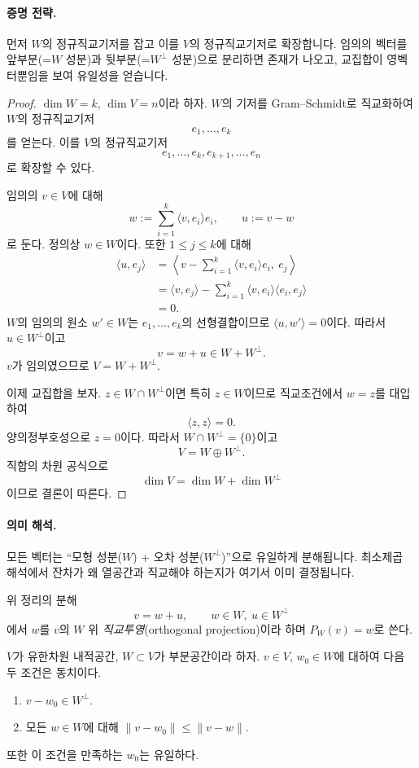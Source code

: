 \paragraph{증명 전략.}
먼저 $W$의 정규직교기저를 잡고 이를 $V$의 정규직교기저로 확장합니다. 임의의 벡터를 앞부분(=$W$ 성분)과 뒷부분(=$W^\perp$ 성분)으로 분리하면 존재가 나오고, 교집합이 영벡터뿐임을 보여 유일성을 얻습니다.

\begin{proof}
$\dim W=k$, $\dim V=n$이라 하자. $W$의 기저를 Gram--Schmidt로 직교화하여 $W$의 정규직교기저
$$
e_1,\dots,e_k
$$
를 얻는다. 이를 $V$의 정규직교기저
$$
e_1,\dots,e_k,e_{k+1},\dots,e_n
$$
로 확장할 수 있다.

임의의 $v\in V$에 대해
$$
w:=\sum_{i=1}^k\langle v,e_i\rangle e_i,\qquad
u:=v-w
$$
로 둔다. 정의상 $w\in W$이다. 또한 $1\le j\le k$에 대해
\begin{align*}
\langle u,e_j\rangle
&=\left\langle v-\sum_{i=1}^k\langle v,e_i\rangle e_i,\ e_j\right\rangle\\
&=\langle v,e_j\rangle-\sum_{i=1}^k\langle v,e_i\rangle\langle e_i,e_j\rangle\\
&=0.
\end{align*}
$W$의 임의의 원소 $w'\in W$는 $e_1,\dots,e_k$의 선형결합이므로 $\langle u,w'\rangle=0$이다. 따라서 $u\in W^\perp$이고
$$
v=w+u\in W+W^\perp.
$$
$v$가 임의였으므로 $V=W+W^\perp$.

이제 교집합을 보자. $z\in W\cap W^\perp$이면 특히 $z\in W$이므로 직교조건에서 $w=z$를 대입하여
$$
\langle z,z\rangle=0.
$$
양의정부호성으로 $z=0$이다. 따라서 $W\cap W^\perp=\{0\}$이고
$$
V=W\oplus W^\perp.
$$
직합의 차원 공식으로
$$
\dim V=\dim W+\dim W^\perp
$$
이므로 결론이 따른다.
\end{proof}

\paragraph{의미 해석.}
모든 벡터는 ``모형 성분($W$) + 오차 성분($W^\perp$)''으로 유일하게 분해됩니다. 최소제곱 해석에서 잔차가 왜 열공간과 직교해야 하는지가 여기서 이미 결정됩니다.

\begin{definition}
위 정리의 분해
$$
v=w+u,\qquad w\in W,\ u\in W^\perp
$$
에서 $w$를 $v$의 $W$ 위 \emph{직교투영}(orthogonal projection)이라 하며 $P_W(v)=w$로 쓴다.
\end{definition}

\begin{theorem}[최소거리 정리]
$V$가 유한차원 내적공간, $W\subset V$가 부분공간이라 하자. $v\in V$, $w_0\in W$에 대하여 다음 두 조건은 동치이다.
\begin{enumerate}[label=(\roman*)]
\item $v-w_0\in W^\perp$.
\item 모든 $w\in W$에 대해 $\|v-w_0\|\le \|v-w\|$.
\end{enumerate}
또한 이 조건을 만족하는 $w_0$는 유일하다.
\end{theorem}

